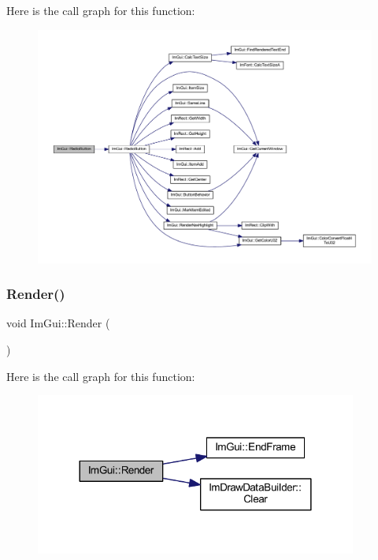 Here is the call graph for this function\+:
\nopagebreak
\begin{figure}[H]
\begin{center}
\leavevmode
\includegraphics[width=350pt]{namespace_im_gui_a018d2b61d2f00bb7a9dd2b1f933b93a5_cgraph}
\end{center}
\end{figure}
\mbox{\label{namespace_im_gui_ab51a164f547317c16c441f1599e3946d}} 
\subsubsection{\texorpdfstring{Render()}{Render()}}
{\footnotesize\ttfamily void Im\+Gui\+::\+Render (\begin{DoxyParamCaption}{ }\end{DoxyParamCaption})}

Here is the call graph for this function\+:
\nopagebreak
\begin{figure}[H]
\begin{center}
\leavevmode
\includegraphics[width=300pt]{namespace_im_gui_ab51a164f547317c16c441f1599e3946d_cgraph}
\end{center}
\end{figure}
\mbox{\label{namespace_im_gui_a23383180b2870fa1326f5c5394fc03d7}} 
